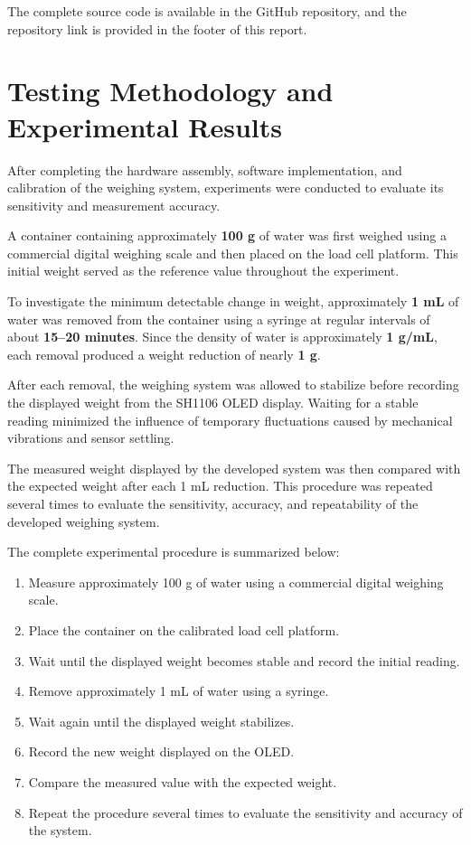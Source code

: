 The complete source code is available in the GitHub repository, and the repository link is provided in the footer of this report.
\thispagestyle{githubpage}

\section{Testing Methodology and Experimental Results}

After completing the hardware assembly, software implementation, and calibration of the weighing system, experiments were conducted to evaluate its sensitivity and measurement accuracy.

A container containing approximately \textbf{100 g} of water was first weighed using a commercial digital weighing scale and then placed on the load cell platform. This initial weight served as the reference value throughout the experiment.

To investigate the minimum detectable change in weight, approximately \textbf{1 mL} of water was removed from the container using a syringe at regular intervals of about \textbf{15--20 minutes}. Since the density of water is approximately \textbf{1 g/mL}, each removal produced a weight reduction of nearly \textbf{1 g}.

After each removal, the weighing system was allowed to stabilize before recording the displayed weight from the SH1106 OLED display. Waiting for a stable reading minimized the influence of temporary fluctuations caused by mechanical vibrations and sensor settling.

The measured weight displayed by the developed system was then compared with the expected weight after each 1 mL reduction. This procedure was repeated several times to evaluate the sensitivity, accuracy, and repeatability of the developed weighing system.

The complete experimental procedure is summarized below:

\begin{enumerate}
    \item Measure approximately 100 g of water using a commercial digital weighing scale.
    \item Place the container on the calibrated load cell platform.
    \item Wait until the displayed weight becomes stable and record the initial reading.
    \item Remove approximately 1 mL of water using a syringe.
    \item Wait again until the displayed weight stabilizes.
    \item Record the new weight displayed on the OLED.
    \item Compare the measured value with the expected weight.
    \item Repeat the procedure several times to evaluate the sensitivity and accuracy of the system.
\end{enumerate}

